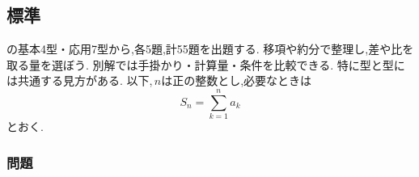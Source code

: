 
    \subsection{標準}\label{節：標準難易度}\label{節：基本と応用から出題されるもの}
      の基本4型・応用7型から,各5題,計55題を出題する.
                移項や約分で整理し,差や比を取る量を選ぼう.
                別解では手掛かり・計算量・条件を比較できる.
                特に型と型には共通する見方がある.
      以下,\,$n$は正の整数とし,必要なときは
      \[
        S_n=\sum_{k=1}^{n}a_k
      \]
      とおく.

      \subsubsection{問題}\label{節：標準難易度：問題}\label{節：基本と応用から出題されるもの：問題}
